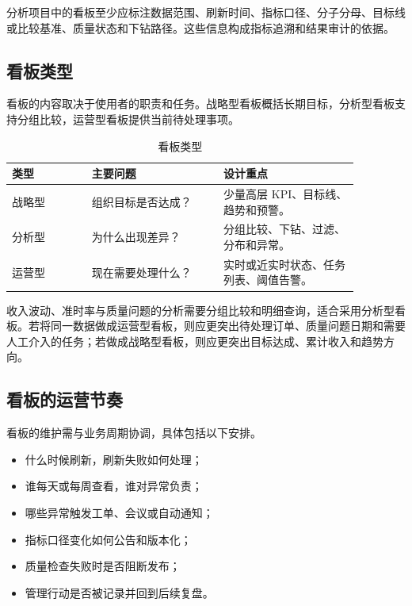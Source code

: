 \begin{convention}[看板最小可解释性]
分析项目中的看板至少应标注数据范围、刷新时间、指标口径、分子分母、目标线或比较基准、质量状态和下钻路径。这些信息构成指标追溯和结果审计的依据。
\end{convention}

\subsection{看板类型}

看板的内容取决于使用者的职责和任务。战略型看板概括长期目标，分析型看板支持分组比较，运营型看板提供当前待处理事项。

\begin{table}[htbp]
\centering
\caption{看板类型}
\begin{tabular}{P{0.20\linewidth}P{0.33\linewidth}P{0.34\linewidth}}
\toprule
{}
类型 & 主要问题 & 设计重点\\
\midrule
战略型 & 组织目标是否达成？ & 少量高层 KPI、目标线、趋势和预警。\\
分析型 & 为什么出现差异？ & 分组比较、下钻、过滤、分布和异常。\\
运营型 & 现在需要处理什么？ & 实时或近实时状态、任务列表、阈值告警。\\
\bottomrule
\end{tabular}
\end{table}

收入波动、准时率与质量问题的分析需要分组比较和明细查询，适合采用分析型看板。若将同一数据做成运营型看板，则应更突出待处理订单、质量问题日期和需要人工介入的任务；若做成战略型看板，则应更突出目标达成、累计收入和趋势方向。

\subsection{看板的运营节奏}

看板的维护需与业务周期协调，具体包括以下安排。
\begin{itemize}
  \item 什么时候刷新，刷新失败如何处理；
  \item 谁每天或每周查看，谁对异常负责；
  \item 哪些异常触发工单、会议或自动通知；
  \item 指标口径变化如何公告和版本化；
  \item 质量检查失败时是否阻断发布；
  \item 管理行动是否被记录并回到后续复盘。
\end{itemize}

